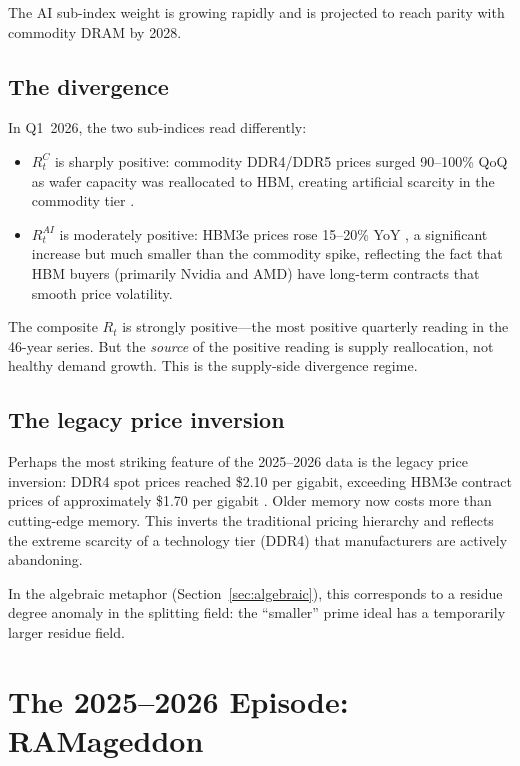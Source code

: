 \documentclass[12pt]{article}
\theoremstyle{definition}
\begin{document}
The AI sub-index weight is growing rapidly and is projected to reach parity with commodity DRAM by 2028.

\subsection{The divergence}

In Q1~2026, the two sub-indices read differently:

\begin{itemize}[itemsep=2pt]
\item $R_t^C$ is sharply positive: commodity DDR4/DDR5 prices surged 90--100\% QoQ as wafer capacity was reallocated to HBM, creating artificial scarcity in the commodity tier \cite{TrendForce2026Q1}.
\item $R_t^{AI}$ is moderately positive: HBM3e prices rose 15--20\% YoY \cite{TrendForce2025Dec}, a significant increase but much smaller than the commodity spike, reflecting the fact that HBM buyers (primarily Nvidia and AMD) have long-term contracts that smooth price volatility.
\end{itemize}

The composite $R_t$ is strongly positive---the most positive quarterly reading in the 46-year series. But the \emph{source} of the positive reading is supply reallocation, not healthy demand growth. This is the supply-side divergence regime.

\subsection{The legacy price inversion}

Perhaps the most striking feature of the 2025--2026 data is the legacy price inversion: DDR4 spot prices reached \$2.10 per gigabit, exceeding HBM3e contract prices of approximately \$1.70 per gigabit \cite{Sourceability2026}. Older memory now costs more than cutting-edge memory. This inverts the traditional pricing hierarchy and reflects the extreme scarcity of a technology tier (DDR4) that manufacturers are actively abandoning.

In the algebraic metaphor (Section~\ref{sec:algebraic}), this corresponds to a residue degree anomaly in the splitting field: the ``smaller'' prime ideal has a temporarily larger residue field.


\section{The 2025--2026 Episode: RAMageddon}
\label{sec:ramageddon}
\end{document}
